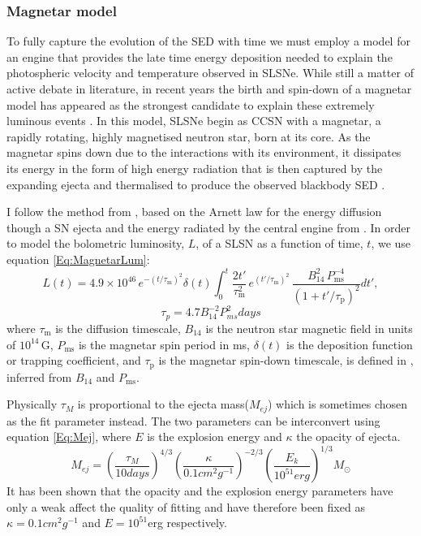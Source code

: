 \subsubsection{Magnetar model}
\label{sec:Magnetar}
To fully capture the evolution of the SED with time we must employ a model for an engine that provides the late time energy deposition needed to explain the photospheric velocity and temperature observed in SLSNe. While still a matter of active debate in literature, in recent years the birth and spin-down of a magnetar model has appeared as the strongest candidate to explain these extremely luminous events \citep{2013ApJ...770..128I,2013Natur.502..346N}. In this model, SLSNe begin as CCSN with a magnetar, a rapidly rotating, highly magnetised neutron star, born at its core. As the magnetar spins down due to the interactions with its environment, it dissipates its energy in the form of high energy radiation that is then captured by the expanding ejecta and thermalised to produce the observed blackbody SED \citep{2010ApJ...717..245K,2010ApJ...719L.204W,2012MNRAS.426L..76D}.

I follow the method from \citet{2013ApJ...770..128I}, based on the Arnett law for the energy diffusion though a SN ejecta \citep{Arnett1982} and the energy radiated by the central engine from \citet{Bildsten2013,Wosley2012}. In order to model the bolometric luminosity, $L$, of a SLSN as a function of time, $t$, we use equation \ref{Eq:MagnetarLum}:
\begin{equation}
L(t) = 4.9\times 10^{46}\,e^{ -(t / \tau_\mathrm{m})^2 }\delta(t) \int_{0}^{t} \frac{2t'}{\tau_\mathrm{m}^2}\,e^{(t'/\tau_\mathrm{m})^2}\,\frac{B_{14}^{2}\,P_{\mathrm{ms}}^{-4}}{\left(1+t'/\tau_\mathrm{p}\right)^2} dt',
\label{Eq:MagnetarLum}
\end{equation}
\begin{equation}
\label{Eq:SDPeriod}
\tau_{p} = 4.7B_{14}^{-2}P_{ms}^{2}days
\end{equation}
\noindent where $\tau_\mathrm{m}$ is the diffusion timescale, $B_{14}$ is the neutron star magnetic field in units of $10^{14}$\,G, $P_{\mathrm{ms}}$ is the magnetar spin period in ms, $\delta(t)$ is the deposition function or trapping coefficient, and $\tau_\mathrm{p}$ is the magnetar spin-down timescale, is defined in , inferred from $B_{14}$ and $P_{\mathrm{ms}}$.

Physically $\tau_M$ is proportional to the ejecta mass($M_{ej}$) which is sometimes chosen as the fit parameter instead. The two parameters can be interconvert using equation \ref{Eq:Mej}, where $E$ is the explosion energy and $\kappa$ the opacity of ejecta.
\begin{equation}
\label{Eq:Mej}
M_{ej} = (\frac{\tau_{M}}{10days})^{4/3}(\frac{\kappa}{0.1cm^2g^{-1}})^{-2/3}(\frac{E_k}{10^{51}erg})^{1/3}M_{\odot}
\end{equation}
\noindent It has been shown \citep{2013ApJ...770..128I,2014ApJ...796...87I,2015MNRAS.452.3869N,2015MNRAS.449.1215P} that the opacity and the explosion energy parameters have only a weak affect the quality of fitting and have therefore been fixed as $\kappa = 0.1cm^2g^{-1}$ and $E = 10^{51}$erg respectively.

